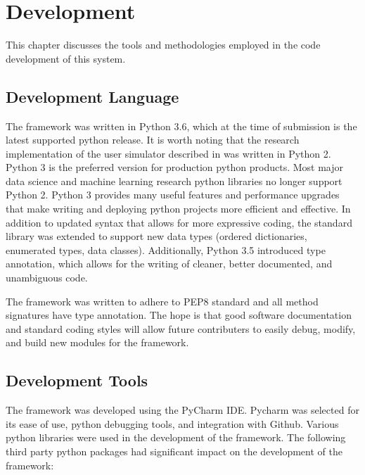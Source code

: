 \chapter{Development}
\label{chap:dev}

This chapter discusses the tools and methodologies employed in the code development of this system. 

\section{Development  Language}

The framework was written in Python 3.6, which at the time of submission is the latest supported python release. It is worth noting that the research implementation of the user simulator described in \cite{li_usersim} was written in Python 2. Python 3 is the preferred version for production python products. Most major data science and machine learning research python libraries no longer support Python 2. Python 3 provides many useful features and performance upgrades that make writing and deploying python projects more efficient and effective. In addition to updated syntax that allows for more expressive coding, the standard library was extended to support new data types (ordered dictionaries, enumerated types, data classes). Additionally, Python 3.5 introduced type annotation, which allows for the writing of cleaner, better documented, and unambiguous code. 

The framework was written to adhere to PEP8 standard and all method signatures have type annotation. The hope is that good software documentation and standard coding styles will allow future contributers to easily debug, modify, and build new modules for the framework. 

\section{Development  Tools}

The framework was developed using the PyCharm IDE. Pycharm was selected for its ease of use, python debugging tools, and integration with Github. Various python libraries were used in the development of the framework. The following third party python packages had significant impact on the development of the framework:

